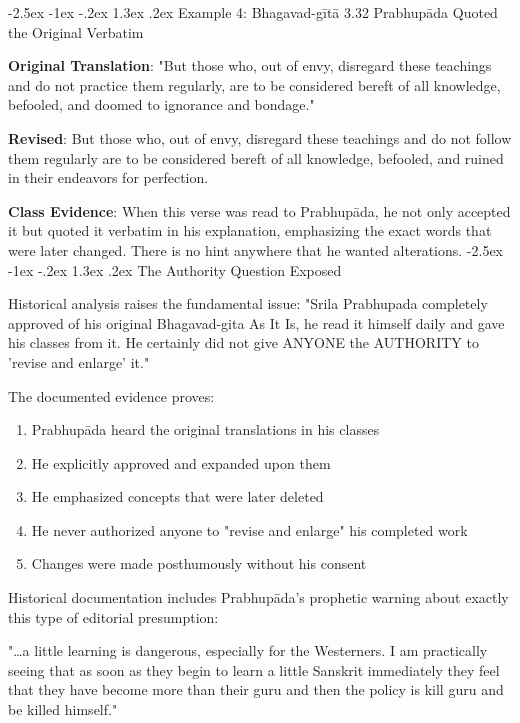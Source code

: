 \documentclass[12pt,twoside]{book}
\makeatletter
\renewcommand\section{\@startsection{section}{1}{\z@}%
{-2.5ex \@plus -1ex \@minus -.2ex}%
{1.3ex \@plus.2ex}%
{\normalfont\Large\bfseries}}
\makeatother
\begin{document}
\vspace{-0.3cm}
\section{Example 4: Bhagavad-gītā 3.32}
\label{sec:org849e1da}
Prabhupāda Quoted the Original Verbatim

\textbf{\textbf{Original Translation}}: "But those who, out of envy, disregard these teachings and do not practice them regularly, are to be considered bereft of all knowledge, befooled, and doomed to ignorance and bondage."

\textbf{\textbf{Revised}}: But those who, out of envy, disregard these teachings and do not follow them regularly are to be considered bereft of all knowledge, befooled, and ruined in their endeavors for perfection.

\textbf{\textbf{Class Evidence}}: When this verse was read to Prabhupāda, he not only accepted it but quoted it verbatim in his explanation, emphasizing the exact words that were later changed. There is no hint anywhere that he wanted alterations.
\section{The Authority Question Exposed}
\label{sec:orgace7f42}

Historical analysis raises the fundamental issue: "Srila Prabhupada completely approved of his original Bhagavad-gita As It Is, he read it himself daily and gave his classes from it. He certainly did not give ANYONE the AUTHORITY to 'revise and enlarge' it."

The documented evidence proves:
\begin{enumerate}
\item Prabhupāda heard the original translations in his classes
\item He explicitly approved and expanded upon them
\item He emphasized concepts that were later deleted
\item He never authorized anyone to "revise and enlarge" his completed work
\item Changes were made posthumously without his consent
\end{enumerate}


Historical documentation includes Prabhupāda's prophetic warning about exactly this type of editorial presumption:

"\ldots{}a little learning is dangerous, especially for the Westerners. I am practically seeing that as soon as they begin to learn a little Sanskrit immediately they feel that they have become more than their guru and then the policy is kill guru and be killed himself."
\end{document}
